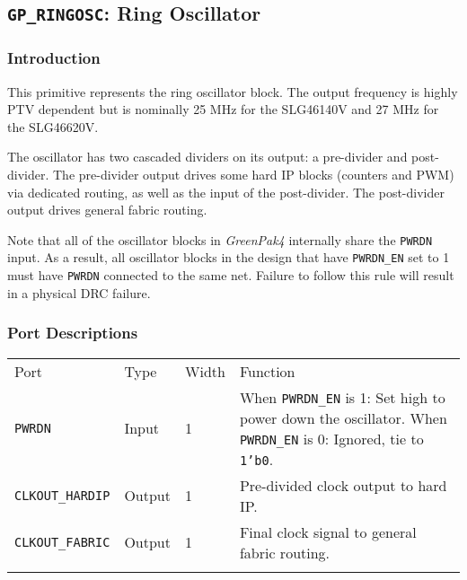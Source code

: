 \documentclass[11pt]{article}
\newcommand{\namestyle}[1]{\textit{#1}}
\newcommand{\tokenstyle}[1]{\texttt{#1}}
\newcommand{\datastyle}[1]{\texttt{#1}}
\newcommand{\whenstyle}[1]{{\fontseries{sb}\selectfont#1}}
\newcommand{\thinhline}{\Xhline{1\arrayrulewidth}}
\newcommand{\thickhline}{\Xhline{2.5\arrayrulewidth}}
\begin{document}

\pagebreak
\subsection{\tokenstyle{GP\_RINGOSC}: Ring Oscillator}
\label{gp-ringosc}

\subsubsection{Introduction}
This primitive represents the ring oscillator block. The output frequency is highly PTV dependent but is nominally 25
MHz for the SLG46140V and 27 MHz for the SLG46620V.

The oscillator has two cascaded dividers on its output: a pre-divider and post-divider. The pre-divider output drives
some hard IP blocks (counters and PWM) via dedicated routing, as well as the input of the post-divider. The
post-divider output drives general fabric routing.

Note that all of the oscillator blocks in \namestyle{GreenPak4} internally share the \tokenstyle{PWRDN} input. As a result, all oscillator
blocks in the design that have \tokenstyle{PWRDN\_EN} set to 1 must have \tokenstyle{PWRDN} connected to the same net. Failure to follow this
rule will result in a physical DRC failure.

\subsubsection{Port Descriptions}

\begin{tabularx}{\textwidth}{lllX}
\thinhline
\whenstyle{Port} & \whenstyle{Type} & \whenstyle{Width} & \whenstyle{Function} \\
\thickhline
\tokenstyle{PWRDN} & Input & 1 &
	\whenstyle{When \tokenstyle{PWRDN\_EN} is 1:} Set high to power down the oscillator. \newline
	\whenstyle{When \tokenstyle{PWRDN\_EN} is 0:} Ignored, tie to \datastyle{1'b0}.\\
\thinhline
\tokenstyle{CLKOUT\_HARDIP} & Output & 1 & Pre-divided clock output to hard IP. \\
\thinhline
\tokenstyle{CLKOUT\_FABRIC} & Output & 1 & Final clock signal to general fabric routing. \\
\thinhline
\end{tabularx}
\end{document}
